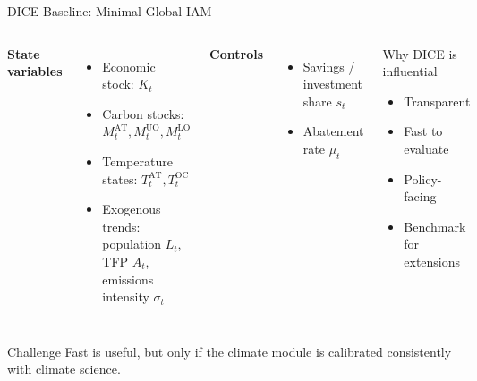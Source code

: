 \documentclass[aspectratio=169,11pt]{beamer}
\begin{document}
\begin{frame}{DICE Baseline: Minimal Global IAM}
\small
\begin{columns}[T]
\textbf{State variables}
\begin{itemize}
    \item Economic stock: $K_t$
    \item Carbon stocks: $M_t^{\mathrm{AT}}, M_t^{\mathrm{UO}}, M_t^{\mathrm{LO}}$
    \item Temperature states: $T_t^{\mathrm{AT}}, T_t^{\mathrm{OC}}$
    \item Exogenous trends: population $L_t$, TFP $A_t$, emissions intensity $\sigma_t$
\end{itemize}

\textbf{Controls}
\begin{itemize}
    \item Savings / investment share $s_t$
    \item Abatement rate $\mu_t$
\end{itemize}

\begin{exampleblock}{Why DICE is influential}
\begin{itemize}
    \item Transparent
    \item Fast to evaluate
    \item Policy-facing
    \item Benchmark for extensions
\end{itemize}
\end{exampleblock}
\end{columns}

\vspace{0.2cm}
\begin{alertblock}{Challenge}
Fast is useful, but only if the climate module is calibrated consistently with climate science.
\end{alertblock}
\end{frame}
\end{document}

